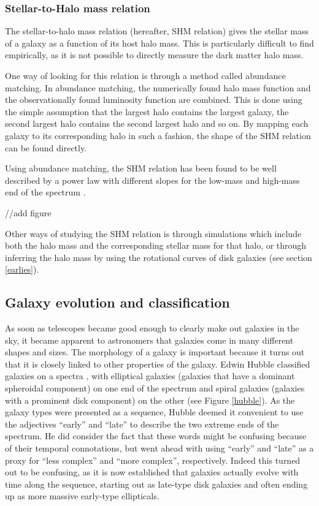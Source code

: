 \subsubsection{Stellar-to-Halo mass relation}

The stellar-to-halo mass relation (hereafter, SHM relation) gives the stellar mass of a galaxy as a function of its host halo mass. This is particularly difficult to find empirically, as it is not possible to directly measure the dark matter halo mass.

One way of looking for this relation is through a method called abundance matching. In abundance matching, the numerically found halo mass function and the observationally found luminosity function are combined. This is done using the simple assumption that the largest halo contains the largest galaxy, the second largest halo contains the second largest halo and so on. By mapping each galaxy to its corresponding halo in such a fashion, the shape of the SHM relation can be found directly.

Using abundance matching, the SHM relation has been found to be well described by a power law with different slopes for the low-mass and high-mass end of the spectrum \parencite{Behroozi2013}. 

//add figure

Other ways of studying the SHM relation is through simulations which include both the halo mass and the corresponding stellar mass for that halo, or through inferring the halo mass by using the rotational curves of disk galaxies (see section \ref{earlies}).

\subsection{Galaxy evolution and classification}

As soon as telescopes became good enough to clearly make out galaxies in the sky, it became apparent to astronomers that galaxies come in many different shapes and sizes. The morphology of a galaxy is important because it turns out that it is closely linked to other properties of the galaxy. Edwin Hubble classified galaxies on a spectra \parencite{Hubble1926}, with elliptical galaxies (galaxies that have a dominant spheroidal component) on one end of the spectrum and spiral galaxies (galaxies with a prominent disk component) on the other (see Figure \ref{hubble}). As the galaxy types were presented as a sequence, Hubble deemed it convenient to use the adjectives ``early'' and ``late'' to describe the two extreme ends of the spectrum. He did consider the fact that these words might be confusing because of their temporal connotations, but went ahead with using ``early'' and ``late'' as a proxy for ``less complex'' and ``more complex'', respectively. Indeed this turned out to be confusing, as it is now established that galaxies actually evolve with time along the sequence, starting out as late-type disk galaxies and often ending up as more massive early-type ellipticals.


